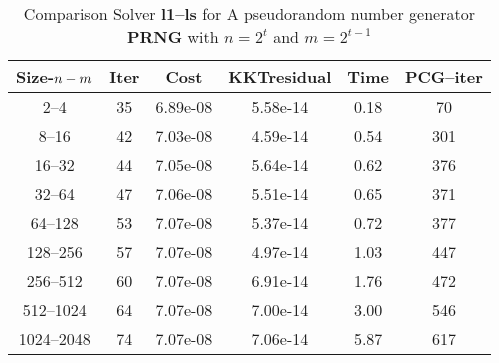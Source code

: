 \documentclass[letterpaper,12pt,oneside,final]{book}
\begin{document}
\begin{table}
\caption{Comparison Solver  {\bf l1--ls} for  A pseudorandom number generator {\bf PRNG} with $n=2^{t}$ and $m=2^{t-1}$} 
\begin{center}
\begin{tabular}{|*{6}{c}|} \hline
Size-$n\--m$ & \multicolumn{1}{c}{Iter} & \multicolumn{1}{c}{Cost}& \multicolumn{1}{c}{KKTresidual} & \multicolumn{1}{c}{Time} & \multicolumn{1}{c|}{PCG--iter} \\ 
\hline
2--4    &35    &6.89e-08    &5.58e-14    &0.18    &70 \\
8--16    &42    &7.03e-08    &4.59e-14    &0.54    &301 \\
16--32    &44    &7.05e-08    &5.64e-14    &0.62    &376 \\
32--64    &47    &7.06e-08    &5.51e-14    &0.65    &371 \\
64--128    &53    &7.07e-08    &5.37e-14    &0.72    &377 \\
128--256    &57    &7.07e-08    &4.97e-14    &1.03    &447 \\
256--512    &60    &7.07e-08    &6.91e-14    &1.76    &472 \\
512--1024    &64    &7.07e-08    &7.00e-14    &3.00    &546 \\
1024--2048    &74    &7.07e-08    &7.06e-14    &5.87    &617 \\
\hline
\end{tabular}
\end{center}
\end{table}
\end{document}
